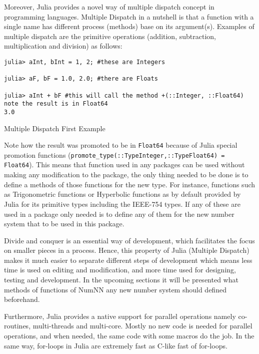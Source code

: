 Moreover, Julia provides a novel way of multiple dispatch\cite{WikiMultipleDispatch} concept in programming languages\cite{JuliaMehtods}. Multiple Dispatch in a nutshell is that a function with a single name has different process (methods) base on its argument(s). Examples of multiple dispatch are the primitive operations (addition, subtraction, multiplication and division) as follows:

\begin{listing}[H]
\begin{verbatim}
julia> aInt, bInt = 1, 2; #these are Integers

julia> aF, bF = 1.0, 2.0; #there are Floats

julia> aInt + bF #this will call the method +(::Integer, ::Float64) note the result is in Float64
3.0
\end{verbatim}
\caption{Multiple Dispatch First Example}
\end{listing}

Note how the result was promoted to be in \texttt{Float64} because of Julia special promotion functions (\texttt{promote_type(::Type{Integer},::Type{Float64}) = Float64}). This means that function used in any packages can be used without making any modification to the package, the only thing needed to be done is to define a methods of those functions for the new type. For instance, functions such as Trigonometric functions or Hyperbolic functions as by default provided by Julia for its primitive types including the IEEE-754 types. If any of these are used in a package only needed is to define any of them for the new number system that to be used in this package.

Divide and conquer is an essential way of development, which facilitates the focus on smaller pieces in a process. Hence, this property of Julia (Multiple Dispatch) makes it much easier to separate different steps of development which means less time is used on editing and modification, and more time used for designing, testing and development. In the upcoming sections it will be presented what methods of functions of NumNN any new number system should defined beforehand.

Furthermore, Julia provides a native support for parallel operations namely co-routines, multi-threads and multi-core. Mostly no new code is needed for parallel operations, and when needed, the same code with some macros do the job. In the same way, for-loops in Julia are extremely fast as C-like fast of for-loops. 
